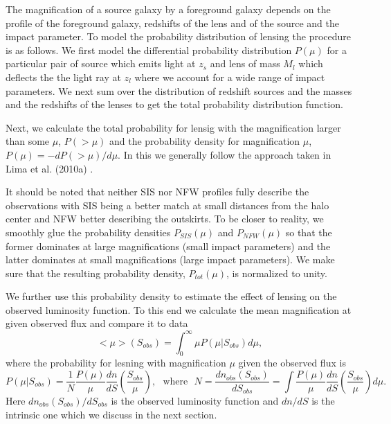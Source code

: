 \documentclass[12pt]{article}
\begin{document}
The magnification of a source galaxy by a foreground galaxy depends on the profile of the foreground galaxy, redshifts of the lens and of the source and the impact parameter.  To model the probability distribution of lensing the  procedure is as follows. We first model the differential probability distribution $P(\mu)$ for a particular pair of source which emits light at $z_s$ and lens of mass $M_l$ which deflects the the light ray at $z_l$ where we account for a wide range of impact parameters. We next sum over the distribution of redshift sources and the masses and the redshifts of the  lenses to get the total probability distribution function.


Next, we calculate the total probability for lensig with the magnification larger than some $\mu$, $P(>\mu)$ and the probability density for magnification $\mu$, $P(\mu) = -dP(>\mu)/d\mu$. In this we generally follow the approach taken in Lima et al. (2010a) \cite{Lima:2010a}. 

It should be noted that neither SIS nor NFW profiles fully describe the observations with SIS being a better match at small distances from the halo center and NFW better describing the outskirts. To be closer to reality,  we smoothly glue the probability densities $P_{SIS}(\mu)$ and $P_{NFW}(\mu)$ so that the former dominates at large magnifications (small impact parameters) and the latter dominates at small  magnifications (large impact parameters). We make sure that the resulting probability density, $P_{tot}(\mu)$, is normalized to unity. 

We further use this probability density to estimate the effect of lensing on the observed luminosity function. To this end we calculate the mean magnification at given observed flux and compare it to data  \begin{equation}
 <\mu>(S_{obs}) = \int_0^\infty \mu P(\mu|S_{obs})  d\mu,
 \end{equation}
where the probability for lesning with magnification $\mu$ given the observed flux \cite{Lima:2010b} is
\begin{equation}
P(\mu|S_{obs}) = \frac{1}{N}\frac{P(\mu)}{\mu}\frac{dn}{dS}\left(\frac{S_{obs}}{\mu}\right), ~~~\textrm{where}~~~N = \frac{dn_{obs}(S_{obs})}{dS_{obs}} = \int  \frac{P(\mu)}{\mu}\frac{dn}{dS}\left(\frac{S_{obs}}{\mu}\right)d\mu.
\end{equation} 
Here $ dn_{obs}(S_{obs})/dS_{obs}$ is the observed luminosity function and $dn/dS$ is the intrinsic one which we discuss in the next section.
\end{document}
